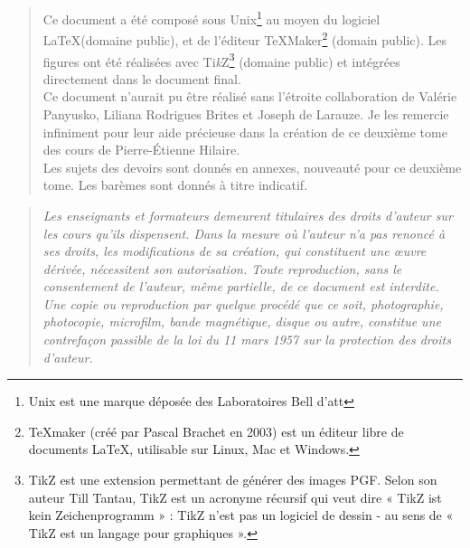 \def\TikZ{{\fontfamily{cmr}Ti{\em k}Z}} 
    \begin {quote}
    Ce document a été composé sous  Unix\footnote{Unix  est une
    marque déposée des  Laboratoires  Bell d'{\sc att}} au moyen  
    du logiciel \LaTeX (domaine  public),
    et de l'éditeur {\TeX}{Maker}\footnote{TeXmaker (créé par Pascal Brachet en 2003) est un éditeur libre de documents LaTeX, utilisable sur Linux, Mac et Windows.} (domain public). 
    Les figures ont été réalisées avec {\TikZ}\footnote{TikZ est une extension permettant de générer des images PGF. Selon son auteur Till Tantau, TikZ est un acronyme récursif qui veut dire « TikZ ist kein Zeichenprogramm » : TikZ n'est pas un logiciel de dessin - au sens de « TikZ est un langage pour graphiques ».} (domaine
   public)  et  intégrées  directement  dans le  document  final. \\
   
   Ce document n'aurait pu être réalisé sans l'étroite collaboration de Valérie Panyusko, Liliana Rodrigues Brites et Joseph de Larauze. Je les remercie infiniment pour leur aide précieuse dans la création de ce deuxième tome des cours de Pierre-Étienne Hilaire. \\
   
   Les sujets des devoirs sont donnés en annexes, nouveauté pour ce deuxième tome. Les barèmes sont donnés à titre indicatif. \\
   
    \end {quote}

   \vspace {12cm}

   \begin {quote}
   \em Les enseignants et formateurs demeurent titulaires des droits d'auteur sur les cours qu'ils dispensent.    
Dans la mesure où l'auteur n'a pas renoncé à ses droits, les modifications de sa création, qui constituent une œuvre dérivée, nécessitent son autorisation. 
    Toute  reproduction,  sans le consentement de l'auteur, 
    même  partielle,  de ce document est
    interdite.  Une copie ou reproduction  par quelque procédé que
    ce   soit,   photographie,    photocopie,   microfilm,   bande
    magnétique,   disque  ou  autre,   constitue  une  contrefaçon
   passible  de la loi du 11  mars  1957  sur la  protection  des
    droits d'auteur.
    \end {quote}
\newpage

\setcounter{page}{1}

